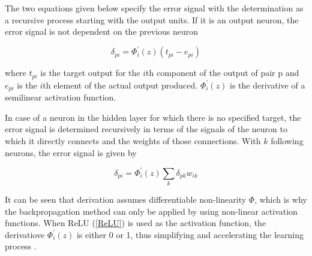 
    

The two equations given below specify the error signal with the determination as a recursive process starting with the output units. If it is an output neuron, the error signal is not dependent on the previous neuron

\begin{equation}
     \delta_{pi} = \Phi_i^{\prime}(z)(t_{pi}- e_{pi})
 \end{equation}

where $t_{pi}$ is the target output for the $i$th component of the output of pair p and $e_{pi}$ is the $i$th element of the actual output produced. $\Phi_i^{\prime}(z)$ is the derivative of a semilinear activation function.

In case of a neuron in the hidden layer for which there is no specified target, the error signal is determined recursively in terms of the signals of the neuron to which it directly connects and the weights of those connections. With $k$ following neurons, the error signal is given by

\begin{equation}
    \delta_{pi} = \Phi_i^{\prime}(z)\sum_k \delta_{pk} w_{ik}
\end{equation}


It can be seen that derivation assumes differentiable non-linearity $\Phi$, which is why the backpropagation method can only be applied by using non-linear activation functions. When ReLU (\cref{ReLU}) is used as the activation function, the derivatiove $\Phi_i^{\prime}(z)$ is either 0 or 1, thus simplifying and accelerating the learning process \cite{back1986propagation}.

